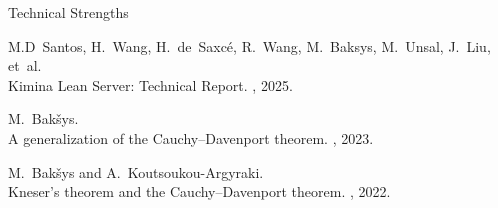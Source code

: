 \documentclass{resume} %
\begin{document}
\begin{rSection}{Technical Strengths}
\begin{thebibliography}{99}
M.D~Santos, H.~Wang, H.~de~Saxcé, R.~Wang, M.~Baksys, M.~Unsal, J.~Liu, et~al. \\
\newblock Kimina Lean Server: Technical Report.
, 2025.


M.~Bakšys. \\
\newblock A generalization of the Cauchy–Davenport theorem.
, 2023.


M.~Bakšys and A.~Koutsoukou-Argyraki. \\
\newblock Kneser's theorem and the Cauchy–Davenport theorem.
, 2022.

\end{thebibliography}
\end{rSection}



\end{document}
